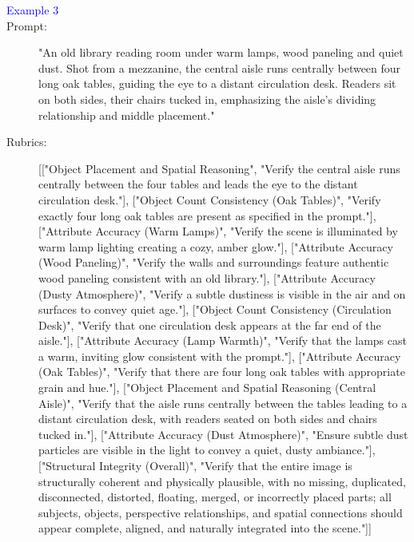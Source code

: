 \begin{tcolorbox}
\begin{description}
\item[\textcolor{blue}{Example 3}]
\item[Prompt:] "An old library reading room under warm lamps, wood paneling and quiet dust. Shot from a mezzanine, the central aisle runs centrally between four long oak tables, guiding the eye to a distant circulation desk. Readers sit on both sides, their chairs tucked in, emphasizing the aisle’s dividing relationship and middle placement."
\item[Rubrics:] [["Object Placement and Spatial Reasoning", "Verify the central aisle runs centrally between the four tables and leads the eye to the distant circulation desk."], ["Object Count Consistency (Oak Tables)", "Verify exactly four long oak tables are present as specified in the prompt."], ["Attribute Accuracy (Warm Lamps)", "Verify the scene is illuminated by warm lamp lighting creating a cozy, amber glow."], ["Attribute Accuracy (Wood Paneling)", "Verify the walls and surroundings feature authentic wood paneling consistent with an old library."], ["Attribute Accuracy (Dusty Atmosphere)", "Verify a subtle dustiness is visible in the air and on surfaces to convey quiet age."], ["Object Count Consistency (Circulation Desk)", "Verify that one circulation desk appears at the far end of the aisle."], ["Attribute Accuracy (Lamp Warmth)", "Verify that the lamps cast a warm, inviting glow consistent with the prompt."], ["Attribute Accuracy (Oak Tables)", "Verify that there are four long oak tables with appropriate grain and hue."], ["Object Placement and Spatial Reasoning (Central Aisle)", "Verify that the aisle runs centrally between the tables leading to a distant circulation desk, with readers seated on both sides and chairs tucked in."], ["Attribute Accuracy (Dust Atmosphere)", "Ensure subtle dust particles are visible in the light to convey a quiet, dusty ambiance."], ["Structural Integrity (Overall)", "Verify that the entire image is structurally coherent and physically plausible, with no missing, duplicated, disconnected, distorted, floating, merged, or incorrectly placed parts; all subjects, objects, perspective relationships, and spatial connections should appear complete, aligned, and naturally integrated into the scene."]]


\end{description}
\end{tcolorbox}
